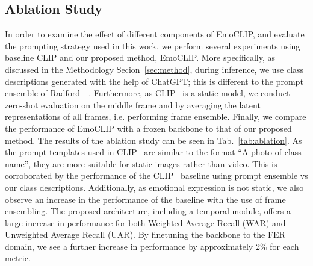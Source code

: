 \documentclass[10pt,twocolumn,letterpaper]{article}
\begin{document}
\subsection{Ablation Study}
\label{sec:ablation}
In order to examine the effect of different components of EmoCLIP, and evaluate the prompting strategy used in this work, we perform several experiments using baseline CLIP and our proposed method, EmoCLIP. More specifically, as discussed in the Methodology Secion~\ref{sec:method}, during inference, we use class descriptions generated with the help of ChatGPT; this is different to the prompt ensemble of Radford~\etal~\cite{radford_CLIP_2021}. Furthermore, as CLIP~\cite{radford_CLIP_2021} is a static model, we conduct zero-shot evaluation on the middle frame and by averaging the latent representations of all frames, i.e. performing frame ensemble. Finally, we compare the performance of EmoCLIP with a frozen backbone to that of our proposed method. The results of the ablation study can be seen in Tab.~\ref{tab:ablation}. As the prompt templates used in CLIP~\cite{radford_CLIP_2021} are similar to the format ``A photo of {class name}'', they are more suitable for static images rather than video. This is corroborated by the performance of the CLIP~\cite{radford_CLIP_2021} baseline using prompt ensemble vs our class descriptions. Additionally, as emotional expression is not static, we also observe an increase in the performance of the baseline with the use of frame ensembling.
The proposed architecture, including a temporal module, offers a large increase in performance for both Weighted Average Recall (WAR) and Unweighted Average Recall (UAR). By finetuning the backbone to the FER domain, we see a further increase in performance by approximately 2\% for each metric. 
\end{document}
